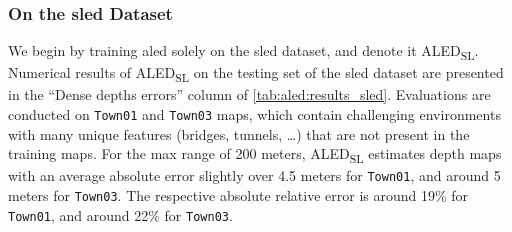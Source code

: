 \subsubsection{On the \acrshort{sled} Dataset}
We begin by training \acrshort{aled} solely on the \acrshort{sled} dataset, and denote it ALED\textsubscript{SL}. Numerical results of ALED\textsubscript{SL} on the testing set of the \acrshort{sled} dataset are presented in the ``Dense depths errors'' column of \cref{tab:aled:results_sled}. Evaluations are conducted on \verb|Town01| and \verb|Town03| maps, which contain challenging environments with many unique features (bridges, tunnels, \dots) that are not present in the training maps. For the max range of 200 meters, ALED\textsubscript{SL} estimates depth maps with an average absolute error slightly over 4.5 meters for \verb|Town01|, and around 5 meters for \verb|Town03|. The respective absolute relative error is around 19\% for \verb|Town01|, and around 22\% for \verb|Town03|.

